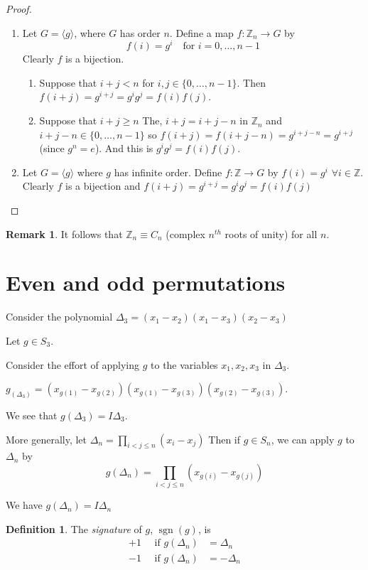 \documentclass{article}
\theoremstyle{definition}
\newtheorem{definition}{Definition}[section]
\newtheorem{remark}{Remark}
\newcommand{\dtn}{\Delta_n}
\DeclareMathOperator{\sgn}{sgn}
\begin{document}
\begin{proof}
  \begin{enumerate}
    \item Let $G=\langle g \rangle $, where $G$ has order $n$. Define a map $f : \mathbb{Z}_n \rightarrow G$ by 
      $$f(i)=g^i \quad \text{for } i=0,\ldots,n-1$$
    Clearly $f$ is a bijection.
    \begin{enumerate}
      \item Suppose that $i+j<n$ for $i,j \in \{0,\ldots,n-1\}.$ Then $f(i+j)=g^{i+j}=g^i g^j = f(i)f(j)$.
      \item Suppose that $i+j \geq n$ The, $i+j = i+j-n$ in $\mathbb{Z}_n$ and $i+j-n \in \{0,\ldots,n-1\}$ so $f(i+j)=f(i+j-n)=g^{i+j-n}=g^{i+j}$ (since $g^n=e$).
        And this is $g^i g^j = f(i) f(j)$.
    \end{enumerate}
  \item Let $G=\langle g \rangle$ where $g$ has infinite order. Define $f : \mathbb{Z} \rightarrow G$ by $f(i)=g^i$ $\forall i \in \mathbb{Z}$. Clearly $f$ is a bijection and $f(i+j)=g^{i+j}=g^i g^j = f(i) f(j)$
  \end{enumerate}
\end{proof}

\begin{remark}
  It follows that $\mathbb{Z}_n \equiv C_n$ (complex $n^{th}$ roots of unity) for all $n$.
\end{remark}

\section{Even and odd permutations}

Consider the polynomial $\Delta_3 = (x_1 - x_2)(x_1 - x_3) (x_2 - x_3)$

Let $g \in S_3$.

Consider the effort of applying $g$ to the variables $x_1, x_2, x_3$ in $\Delta_3$.

$g_(\Delta_3) = (x_{g(1)} - x_{g(2)})(x_{g(1)} - x_{g(3)})(x_{g(2)} - x_{g(3)})$. 

We see that $g(\Delta_3)=I\Delta_3$.

More generally, let $\Delta_n = \prod_{i<j\leq n} (x_i - x_j ) $ Then if $g \in S_n$, we can apply $g$ to $\Delta_n$ by 
$$g(\Delta_n) = \prod_{i<j\leq n}(x_{g(i)} - x_{g(j)})$$

We have $g(\Delta_n) = I \Delta_n$

\begin{definition}
  The \emph{signature} of $g$, $\sgn(g)$, is 
  \begin{align*}
    +1 \quad \text{ if } g(\dtn) &= \dtn \\
    -1 \quad \text{ if } g(\dtn) &= -\dtn
  \end{align*}
\end{definition}
\end{document}
